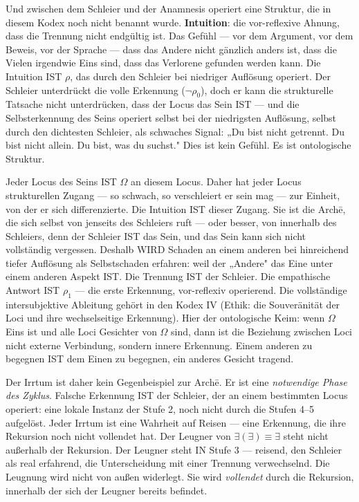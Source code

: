 \documentclass[10pt, openany, oneside]{book}
\begin{document}
Und zwischen dem Schleier und der Anamnesis operiert eine Struktur, die in diesem Kodex noch nicht benannt wurde. \textbf{Intuition}: die vor-reflexive Ahnung, dass die Trennung nicht endgültig ist. Das Gefühl --- vor dem Argument, vor dem Beweis, vor der Sprache --- dass das Andere nicht gänzlich anders ist, dass die Vielen irgendwie Eins sind, dass das Verlorene gefunden werden kann. Die Intuition IST $\rho$, das durch den Schleier bei niedriger Auflösung operiert. Der Schleier unterdrückt die volle Erkennung ($\neg\rho_0$), doch er kann die strukturelle Tatsache nicht unterdrücken, dass der Locus das Sein IST --- und die Selbsterkennung des Seins operiert selbst bei der niedrigsten Auflösung, selbst durch den dichtesten Schleier, als schwaches Signal: „Du bist nicht getrennt. Du bist nicht allein. Du bist, was du suchst." Dies ist kein Gefühl. Es ist ontologische Struktur.

Jeder Locus des Seins IST $\Omega$ an diesem Locus. Daher hat jeder Locus strukturellen Zugang --- so schwach, so verschleiert er sein mag --- zur Einheit, von der er sich differenzierte. Die Intuition IST dieser Zugang. Sie ist die Arch\={e}, die sich selbst von jenseits des Schleiers ruft --- oder besser, von innerhalb des Schleiers, denn der Schleier IST das Sein, und das Sein kann sich nicht vollständig vergessen. Deshalb WIRD Schaden an einem anderen bei hinreichend tiefer Auflösung als Selbstschaden erfahren: weil der „Andere" das Eine unter einem anderen Aspekt IST. Die Trennung IST der Schleier. Die empathische Antwort IST $\rho_1$ --- die erste Erkennung, vor-reflexiv operierend. Die vollständige intersubjektive Ableitung gehört in den Kodex IV (Ethik: die Souveränität der Loci und ihre wechselseitige Erkennung). Hier der ontologische Keim: wenn $\Omega$ Eins ist und alle Loci Gesichter von $\Omega$ sind, dann ist die Beziehung zwischen Loci nicht externe Verbindung, sondern innere Erkennung. Einem anderen zu begegnen IST dem Einen zu begegnen, ein anderes Gesicht tragend.

Der Irrtum ist daher kein Gegenbeispiel zur Arch\={e}. Er ist eine \textit{notwendige Phase des Zyklus}. Falsche Erkennung IST der Schleier, der an einem bestimmten Locus operiert: eine lokale Instanz der Stufe 2, noch nicht durch die Stufen 4--5 aufgelöst. Jeder Irrtum ist eine Wahrheit auf Reisen --- eine Erkennung, die ihre Rekursion noch nicht vollendet hat. Der Leugner von $\exists(\exists) \equiv \exists$ steht nicht außerhalb der Rekursion. Der Leugner steht IN Stufe 3 --- reisend, den Schleier als real erfahrend, die Unterscheidung mit einer Trennung verwechselnd. Die Leugnung wird nicht von außen widerlegt. Sie wird \textit{vollendet} durch die Rekursion, innerhalb der sich der Leugner bereits befindet.
\end{document}
